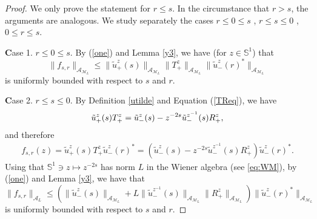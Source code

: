 \documentclass[12pt,oneside,onecolumn,open]{article}
\begin{document}
    \begin{proof} 
We only prove the statement for $ r \leq s $. In the circumstance that $  r > s $, the arguments are analogous. We study separately the cases   
 $    r \leq 0 \leq s $ , 
     $  r \leq s \leq 0 $ , 
     $  0 \leq r \leq s  .  $



{\textbf Case 1.     $ r \leq 0 \leq s $.} 
By (\ref{one}) and Lemma \ref{y3}, we have (for $ z \in \mathbb{S}^1 $) that
\begin{equation}
     \| f_{s,r} \|_{\mathcal{A}_{\mathcal{M}_L}} \leq \|\tilde{u}_+ ^{z}(s)\|_{\mathcal{A}_{\mathcal{M}_L}}\|T_+^{z}\|_ {\mathcal{A}_{\mathcal{M}_L}}\|\tilde{u}_-^{z}(r)^{*}\|_{\mathcal{A}_{\mathcal{M}_L}} 
\end{equation}
is uniformly bounded with respect to \( s \) and \( r \).


{\textbf Case 2.     $ r \leq s \leq 0  $.} By Definition \ref{utilde} and Equation (\ref{TReq}), we have
\begin{align}
    \tilde{u}_+^{z}(s) T_+^{z} %
    \notag = \tilde{u}_-^{z}(s) - z^{-2s} \tilde{u}_-^{z^{-1}}(s) R_+^{z},
\end{align}
and therefore
\begin{align}
    f_{s,r}(z) = \tilde{u}_+^{z}(s) T_+^{z} \tilde{u}_-^{z}(r)^* = \left( \tilde{u}_-^{z}(s) - z^{-2s} \tilde{u}_-^{z^{-1}}(s) R_+^{z}\right) \tilde{u}_-^{z}(r)^*.
\end{align} Using  that $\mathbb{S}^{1}\ni z\mapsto z^{-2s}$ has norm $L$ in the Wiener algebra (see \eqref{eq:WM}), by   (\ref{one}) and Lemma \ref{y3},  we have that
\begin{equation}
     \| f_{s,r} \|_{\mathcal{A}_{L}} \leq (\|\tilde{u}_-^{z}(s)\|_{\mathcal{A}_{\mathcal{M}_L}} + L \| \tilde{u}_-^{z^{-1}}(s) \|_{\mathcal{A}_{\mathcal{M}_L}}\|R_+^{z} \|_{\mathcal{A}_{\mathcal{M}_L}} )\| \tilde{u}_-^{z}(r)^*\|_{\mathcal{A}_{\mathcal{M}_L}}
\end{equation}
is uniformly bounded with respect to \( s \) and \( r \).


\end{proof}
\end{document}
